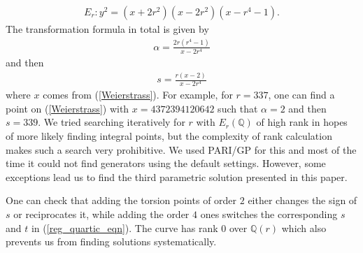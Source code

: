 \documentclass{amsart}
\begin{document}
\begin{align} \label{Weierstrass}
     E_r  :   y^2 = (x+2r^2)(x-2r^2)(x-r^4-1).
\end{align}
The transformation formula in total is given by
\begin{align} \label{transformation_formula}
   \alpha = \frac{2r(r^4-1)}{x-2r^4}
\end{align}
and then
\begin{align*}
    s = \frac{r(x-2)}{x-2r^4}
\end{align*}
where $x$ comes from (\ref{Weierstrass}).
For example, for $r=337$, one can find a point on (\ref{Weierstrass}) with $x=4372394120642$ such that $\alpha = 2$ and then $s=339$. We tried searching iteratively for $r$ with $E_r(\mathbb{Q})$ of high rank in hopes of more likely finding integral points, but the complexity of rank calculation makes such a search very prohibitive. We used PARI/GP for this and most of the time it could not find generators using the default settings. However, some exceptions lead us to find the third parametric solution presented in this paper.

One can check that adding the torsion points of order $2$ either changes the sign of $s$ or reciprocates it, while adding the order $4$ ones switches the corresponding $s$ and $t$ in (\ref{reg_quartic_eqn}).
The curve has rank $0$ over $\mathbb{Q}(r)$ which also prevents us from finding solutions systematically.
\end{document}
